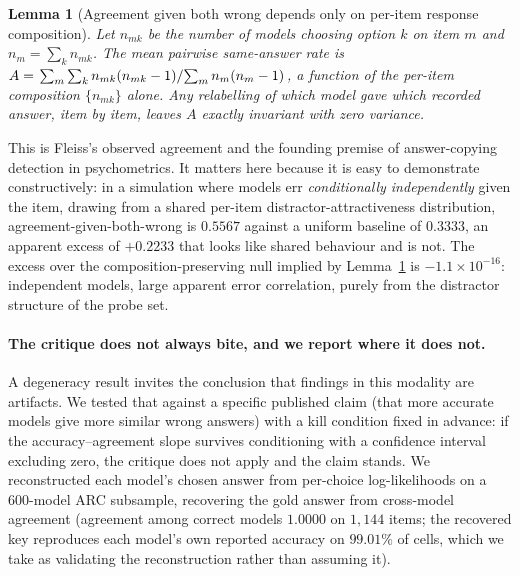 \documentclass{article}
\newtheorem{lemma}{Lemma}
\begin{document}
\begin{lemma}[Agreement given both wrong depends only on per-item response composition]
\label{lem:fleiss}
Let $n_{mk}$ be the number of models choosing option $k$ on item $m$ and $n_m=\sum_k n_{mk}$. The
mean pairwise same-answer rate is
$A=\left.\sum_m\sum_k n_{mk}(n_{mk}-1)\middle/\sum_m n_m(n_m-1)\right.$,
a function of the per-item composition $\{n_{mk}\}$ alone. Any relabelling of which model gave
which recorded answer, item by item, leaves $A$ exactly invariant with zero variance.
\end{lemma}

\noindent This is Fleiss's observed agreement \citep{fleiss1971} and the founding premise of
answer-copying detection in psychometrics. It matters here because it is easy to demonstrate
constructively: in a simulation where models err \emph{conditionally independently} given the item,
drawing from a shared per-item distractor-attractiveness distribution, agreement-given-both-wrong is
$0.5567$ against a uniform baseline of $0.3333$, an apparent excess of $+0.2233$ that looks like
shared behaviour and is not. The excess over the composition-preserving null implied by
Lemma~\ref{lem:fleiss} is $-1.1\times10^{-16}$: independent models, large apparent error
correlation, purely from the distractor structure of the probe set.

\paragraph{The critique does not always bite, and we report where it does not.} A degeneracy result
invites the conclusion that findings in this modality are artifacts. We tested that against a
specific published claim (that more accurate models give more similar wrong answers) with a
kill condition fixed in advance: if the accuracy--agreement slope survives conditioning with a
confidence interval excluding zero, the critique does not apply and the claim stands. We
reconstructed each model's chosen answer from per-choice log-likelihoods on a $600$-model ARC
subsample, recovering the gold answer from cross-model agreement (agreement among correct models
$1.0000$ on $1{,}144$ items; the recovered key reproduces each model's own reported accuracy on
$99.01\%$ of cells, which we take as validating the reconstruction rather than assuming it).
\end{document}
